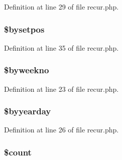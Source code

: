 \-Definition at line 29 of file recur.\-php.

\hypertarget{class_when_a7d5adf3eb4cbd77f0b3890c8ae88d3b7}{
\subsubsection[{\$bysetpos}]{\setlength{\rightskip}{0pt plus 5cm}\${\bf bysetpos}}}\label{class_when_a7d5adf3eb4cbd77f0b3890c8ae88d3b7}


\-Definition at line 35 of file recur.\-php.

\hypertarget{class_when_af53eb19e3c262d64bcda47bf441dd4ec}{
\subsubsection[{\$byweekno}]{\setlength{\rightskip}{0pt plus 5cm}\${\bf byweekno}}}\label{class_when_af53eb19e3c262d64bcda47bf441dd4ec}


\-Definition at line 23 of file recur.\-php.

\hypertarget{class_when_ab5b023a775eb407a1acc3a14f775740d}{
\subsubsection[{\$byyearday}]{\setlength{\rightskip}{0pt plus 5cm}\${\bf byyearday}}}\label{class_when_ab5b023a775eb407a1acc3a14f775740d}


\-Definition at line 26 of file recur.\-php.

\hypertarget{class_when_af789423037bbc89dc7c850e761177570}{
\subsubsection[{\$count}]{\setlength{\rightskip}{0pt plus 5cm}\${\bf count}}}\label{class_when_af789423037bbc89dc7c850e761177570}


